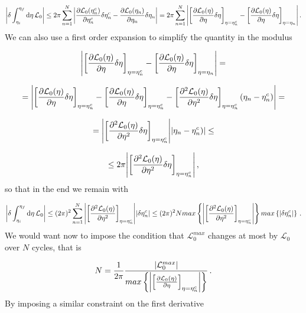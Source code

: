 \documentclass[12pt, class=report, crop=false]{standalone}
\begin{document}
\begin{equation*}
  \abs{\delta \int_{\eta_i}^{\eta_f} \dd{\eta} \mathcal{L}_0} \leq 2\pi \sum_{n=1}^{N} \abs{\pdv{\mathcal{L}_0 (\eta_n^c)}{\eta_n^c} \delta \eta_n^c - \pdv{\mathcal{L}_0 (\eta_n)}{\eta_n} \delta \eta_n} = 2\pi \sum_{n=1}^{N} \abs{\left[\pdv{\mathcal{L}_0 (\eta)}{\eta} \delta \eta\right]_{\eta=\eta_n^c} - \left[\pdv{\mathcal{L}_0 (\eta)}{\eta} \delta \eta\right]_{\eta=\eta_n}}\,.
\end{equation*}
We can also use a first order expansion to simplify the quantity in the modulus

\begin{equation*}
  \abs{\left[\pdv{\mathcal{L}_0 (\eta)}{\eta} \delta \eta\right]_{\eta=\eta_n^c} - \left[\pdv{\mathcal{L}_0 (\eta)}{\eta} \delta \eta\right]_{\eta=\eta_n}} =
\end{equation*}

\begin{equation*}
  = \abs{\left[\pdv{\mathcal{L}_0 (\eta)}{\eta} \delta \eta\right]_{\eta=\eta_n^c} - \left[\pdv{\mathcal{L}_0 (\eta)}{\eta} \delta \eta\right]_{\eta=\eta_n^c} - \left[\pdv[2]{\mathcal{L}_0 (\eta)}{\eta} \delta \eta\right]_{\eta = \eta_n^c} (\eta_n - \eta_n^c)} =
\end{equation*}

\begin{equation*}
  = \abs{\left[\pdv[2]{\mathcal{L}_0 (\eta)}{\eta} \delta \eta\right]_{\eta = \eta_n^c}} \abs{\eta_n - \eta_n^c)} \leq
\end{equation*}

\begin{equation*}
  \leq 2\pi \abs{\left[\pdv[2]{\mathcal{L}_0 (\eta)}{\eta} \delta \eta\right]_{\eta = \eta_n^c}}\,,
\end{equation*}
so that in the end we remain with

\begin{equation}
  \label{eq:bound-of-cyc-lag}
  \abs{\delta \int_{\eta_i}^{\eta_f} \dd{\eta} \mathcal{L}_0} \leq (2\pi)^2 \sum_{n=1}^{N} \abs{\left[\pdv[2]{\mathcal{L}_0 (\eta)}{\eta} \right]_{\eta = \eta_n^c}} \abs{\delta \eta_n^c} \leq (2\pi)^2 N max\left\{\abs{\left[\pdv[2]{\mathcal{L}_0 (\eta)}{\eta} \right]_{\eta = \eta_n^c}}\right\} max\left\{\abs{\delta \eta_n^c}\right\}\,.
\end{equation}
We would want now to impose the condition that \(\mathcal{L}_0^{max}\) changes at most by \(\mathcal{L}_0\) over \(N\) cycles, that is

\begin{equation}
  N = \frac{1}{2\pi} \frac{\abs{\mathcal{L}_0^{max}}}{max\left\{\abs{\left[\pdv{\mathcal{L}_0 (\eta)}{\eta} \right]_{\eta = \eta_n^c}}\right\}}\,.
\end{equation}
By imposing a similar constraint on the first derivative
\end{document}
